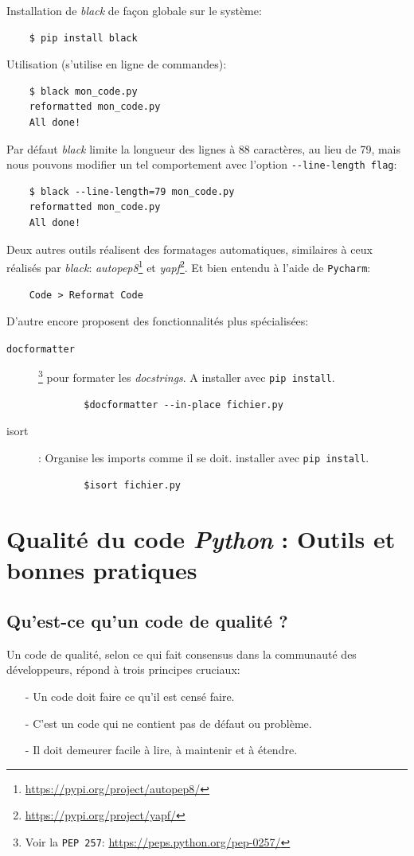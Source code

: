 \documentclass[a4paper,12pt]{book}
\begin{document}
Installation de \textit{black} de façon globale sur le système:
\begin{verbatim}
    $ pip install black
\end{verbatim}
\medskip

Utilisation (s'utilise en ligne de commandes):
\begin{verbatim}
    $ black mon_code.py
    reformatted mon_code.py
    All done!
\end{verbatim}
\medskip


Par défaut \textit{black} limite la longueur des lignes à 88 caractères, au lieu de 79, mais nous pouvons modifier un tel comportement avec l'option \verb|--line-length flag|:
\begin{verbatim}
    $ black --line-length=79 mon_code.py
    reformatted mon_code.py
    All done!
\end{verbatim}
\medskip

Deux autres outils réalisent des formatages automatiques, similaires à ceux réalisés par \textit{black}: \textit{autopep8}\footnote{\url{https://pypi.org/project/autopep8/}} et \textit{yapf}\footnote{\url{https://pypi.org/project/yapf/}}. Et bien entendu à l'aide de \texttt{Pycharm}:
\begin{verbatim}
    Code > Reformat Code
\end{verbatim}

D'autre encore proposent des fonctionnalités plus spécialisées:
\begin{description}
	\item[\texttt{docformatter}]\footnote{Voir la \texttt{PEP 257}: \url{https://peps.python.org/pep-0257/}} pour formater les \textit{docstrings}. A installer avec \texttt{pip install}.
	\begin{verbatim}
	    $docformatter --in-place fichier.py
	\end{verbatim}
	\item[isort]: Organise les imports comme il se doit.  installer avec \texttt{pip install}.
	\begin{verbatim}
	    $isort fichier.py
	\end{verbatim}
\end{description}
\medskip

\chapter{Qualité du code \textit{Python} : Outils et bonnes pratiques}
\section{Qu’est-ce qu’un code de qualité ?}
Un code de qualité, selon ce qui fait consensus dans la communauté des développeurs, répond à trois principes cruciaux:
\begin{itemize}
	\item[-] Un code doit faire ce qu’il est censé faire.
	\item[-] C'est un code qui ne contient pas de défaut ou problème.
	\item[-] Il doit demeurer facile à lire, à maintenir et à étendre.
\end{itemize}
\medskip
\end{document}
